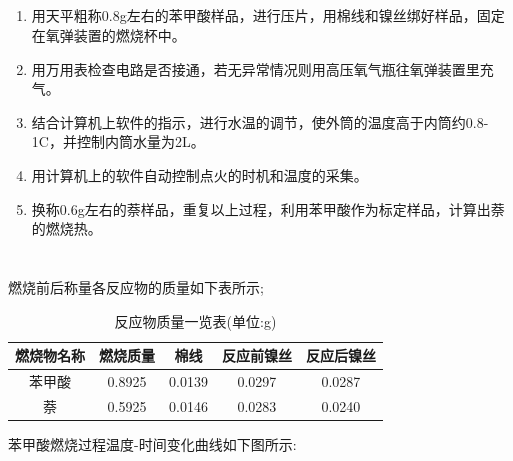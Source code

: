 ﻿\documentclass[10.5pt]{article}
\begin{document}
\subsection{\textbf{}}
\begin{enumerate}
\item 用天平粗称0.8g左右的苯甲酸样品，进行压片，用棉线和镍丝绑好样品，固定在氧弹装置的燃烧杯中。
\item 用万用表检查电路是否接通，若无异常情况则用高压氧气瓶往氧弹装置里充气。
\item 结合计算机上软件的指示，进行水温的调节，使外筒的温度高于内筒约0.8-1\degree C，并控制内筒水量为2L。
\item 用计算机上的软件自动控制点火的时机和温度的采集。
\item 换称0.6g左右的萘样品，重复以上过程，利用苯甲酸作为标定样品，计算出萘的燃烧热。
\end{enumerate}
\section{\textbf{}}
\subsection{\textbf{}}
燃烧前后称量各反应物的质量如下表所示;
\begin{table}[!ht]
\centering
\caption{反应物质量一览表(单位:g)}
\begin{tabular}{ccccc}
\hline
燃烧物名称 & 燃烧质量& 棉线 & 反应前镍丝 & 反应后镍丝\\
\hline
苯甲酸 & 0.8925 & 0.0139 & 0.0297 & 0.0287\\
萘 & 0.5925 & 0.0146 & 0.0283 & 0.0240 \\
\hline
\end{tabular}
\end{table}
苯甲酸燃烧过程温度-时间变化曲线如下图所示:
\end{document}

